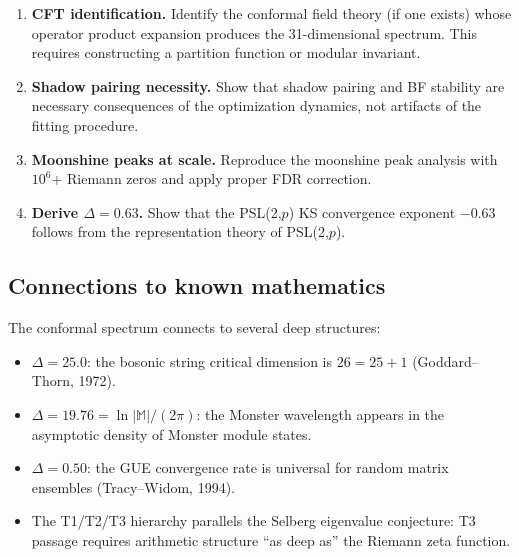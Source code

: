 \documentclass[11pt]{amsart}
\theoremstyle{definition}
\begin{document}
\begin{enumerate}[label=\textbf{P\arabic*.}]
\item \textbf{CFT identification.} Identify the conformal field theory (if one exists) whose operator product expansion produces the 31-dimensional spectrum. This requires constructing a partition function or modular invariant.

\item \textbf{Shadow pairing necessity.} Show that shadow pairing and BF stability are necessary consequences of the optimization dynamics, not artifacts of the fitting procedure.

\item \textbf{Moonshine peaks at scale.} Reproduce the moonshine peak analysis with $10^6$+ Riemann zeros and apply proper FDR correction.

\item \textbf{Derive $\Delta = 0.63$.} Show that the PSL(2,$p$) KS convergence exponent $-0.63$ follows from the representation theory of PSL(2,$p$).
\end{enumerate}

\subsection{Connections to known mathematics}

The conformal spectrum connects to several deep structures:
\begin{itemize}
\item $\Delta = 25.0$: the bosonic string critical dimension is $26 = 25 + 1$ (Goddard--Thorn, 1972).
\item $\Delta = 19.76 = \ln|\mathbb{M}|/(2\pi)$: the Monster wavelength appears in the asymptotic density of Monster module states.
\item $\Delta = 0.50$: the GUE convergence rate is universal for random matrix ensembles (Tracy--Widom, 1994).
\item The T1/T2/T3 hierarchy parallels the Selberg eigenvalue conjecture: T3 passage requires arithmetic structure ``as deep as'' the Riemann zeta function.
\end{itemize}
\end{document}
